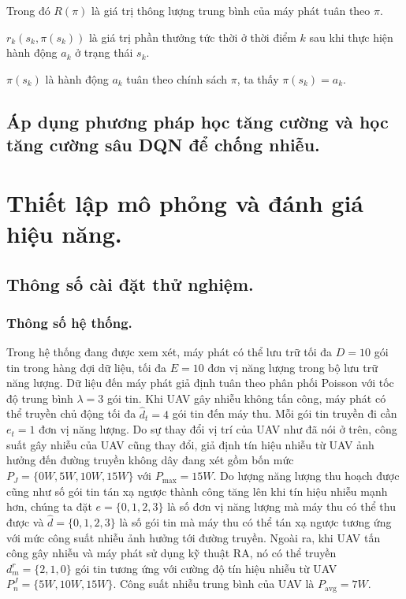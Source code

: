 \documentclass{uetgraduation}
\begin{document}
Trong đó $R(\pi)$ là giá trị thông lượng trung bình của máy phát tuân theo $\pi$.

$r_k(s_k, \pi(s_k))$ là giá trị phần thưởng tức thời ở thời điểm $k$ sau khi thực hiện hành động $a_k$ ở trạng thái $s_k$. 

$\pi(s_k)$ là hành động $a_k$ tuân theo chính sách $\pi$, ta thấy $\pi(s_k) = a_k$.

\section{Áp dụng phương pháp học tăng cường và học tăng cường sâu DQN để chống nhiễu.}


\chapter{Thiết lập mô phỏng và đánh giá hiệu năng.}
\section{Thông số cài đặt thử nghiệm.}
\subsection{Thông số hệ thống.}
Trong hệ thống đang được xem xét, máy phát có thể lưu trữ tối đa $D = 10$ gói tin trong hàng đợi dữ liệu, tối đa $E = 10$ đơn vị năng lượng
trong bộ lưu trữ năng lượng. Dữ liệu đến máy phát giả định tuân theo phân phối Poisson với tốc độ trung bình $\lambda = 3$ 
gói tin. Khi UAV gây nhiễu không tấn công, máy phát có thể truyền chủ động tối đa $\hat{d}_t = 4$ gói tin đến máy thu. Mỗi gói tin truyền đi cần
$e_t = 1$ đơn vị năng lượng. Do sự thay đổi vị trí của UAV như đã nói ở trên, công suất gây nhiễu của UAV cũng thay đổi, giả định tín hiệu nhiễu từ 
UAV ảnh hưởng đến đường truyền không dây đang xét gồm bốn mức $P_J = \{0W, 5W, 10W, 15W\}$ với $P_{\text{max}} = 15W$. Do lượng năng lượng
thu hoạch được cũng như số gói tin tán xạ ngược thành công tăng lên khi tín hiệu nhiễu mạnh hơn, chúng ta đặt $e = \{0, 1, 2, 3\}$ là số đơn vị
năng lượng mà máy thu có thể thu được và $\hat{d} = \{0, 1, 2, 3\}$ là số gói tin mà máy thu có thể tán xạ ngược tương ứng với mức công suất nhiễu
ảnh hưởng tới đường truyền. Ngoài ra, khi UAV tấn công gây nhiễu và máy phát sử dụng kỹ thuật RA, nó có thể truyền $d^r_m = \{2, 1, 0\}$ gói tin
tương ứng với cường độ tín hiệu nhiễu từ UAV $P^J_n = \{5W, 10W, 15W\}$. Công suất nhiễu trung bình của UAV là $P_\text{avg} = 7W$.
\end{document}
